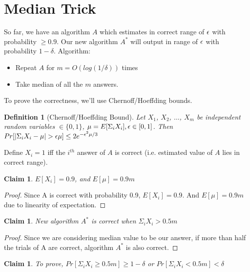\documentclass[11pt]{article}
\newtheorem{definition}[theorem]{Definition}
\newtheorem{claim}[theorem]{Claim}
\def\eps{\ensuremath\epsilon}
\begin{document}
\section{Median Trick}
So far, we have an algorithm $A$ which estimates in correct range of $\eps$ with probability $\ge 0.9$. Our new algorithm $A^{\ast}$ will output in range of $\eps$ with probability $1-\delta$.
Algorithm:
\begin{itemize}
\item Repeat $A$ for $m=O(log (1/\delta))$ times
\item Take median of all the $m$ answers.
\end{itemize}

To prove the correctness, we'll use Chernoff/Hoeffding bounds.

\begin{definition}
[Chernoff/Hoeffding Bound]
Let $X_{1}$, $X_{2}$, $\ldots$, $X_{m}$ be independent random variables $\in \{0,1\}$,
$\mu = E[\Sigma_{i} X_{i}], \eps \in [0,1]$.
Then $Pr[|\Sigma_{i} X_{i}-\mu| > \eps\mu] \leq 2e^{-\eps^{2}\mu/3}$
\end{definition}

Define $X_{i} = 1$ iff the $i^{th}$ answer of $A$ is correct (i.e. estimated value of $A$ lies in correct range).

\begin{claim}
$E[X_{i}] = 0.9$, and $E[\mu] = 0.9m$
\end{claim}

\begin{proof}
Since A is correct with probability 0.9, $E[X_{i}] = 0.9$. And $E[\mu] = 0.9m$ due to linearity of expectation.
\end{proof}

\begin{claim}
New algorithm $A^{\ast}$ is correct when $\Sigma_{i} X_{i} > 0.5m$
\end{claim}

\begin{proof}
Since we are considering median value to be our answer, if more than half the trials of A are correct, algorithm $A^{\ast}$ is also correct.
\end{proof}

\begin{claim}
To prove, $Pr[\Sigma_{i} X_{i} \ge 0.5m] \ge 1-\delta$ or $Pr[\Sigma_{i} X_{i} < 0.5m] < \delta$
\end{claim}
\end{document}
